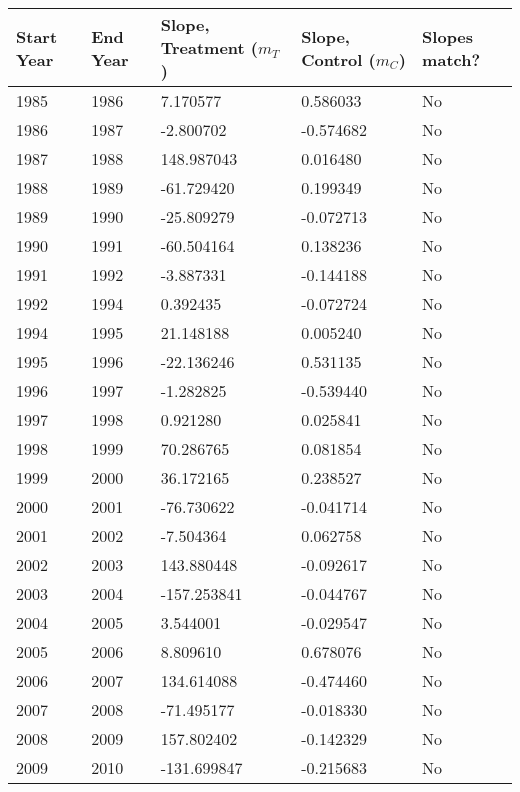 \begin{longtable}{|p{1.2cm}|p{1.2cm}|p{2.2cm}|p{2cm}|p{1.5cm}|}
\centering
\textbf{Start Year} & \textbf{End Year} & \textbf{Slope, Treatment (\({m_T}\)) } & \textbf{Slope, Control (\({m_C}\))} & \textbf{Slopes match?}\\
\hline
1985\rule{0pt}{4ex} & 1986 & 7.170577 & 0.586033 & No\\
1986\rule{0pt}{4ex} & 1987 & -2.800702 & -0.574682 & No\\
1987\rule{0pt}{4ex} & 1988 & 148.987043 & 0.016480 & No\\
1988\rule{0pt}{4ex} & 1989 & -61.729420 & 0.199349 & No\\
1989\rule{0pt}{4ex} & 1990 & -25.809279 & -0.072713 & No\\
1990\rule{0pt}{4ex} & 1991 & -60.504164 & 0.138236 & No\\
1991\rule{0pt}{4ex} & 1992 & -3.887331 & -0.144188 & No\\
1992\rule{0pt}{4ex} & 1994 & 0.392435 & -0.072724 & No\\
1994\rule{0pt}{4ex} & 1995 & 21.148188 & 0.005240 & No\\
1995\rule{0pt}{4ex} & 1996 & -22.136246 & 0.531135 & No\\
1996\rule{0pt}{4ex} & 1997 & -1.282825 & -0.539440 & No\\
1997\rule{0pt}{4ex} & 1998 & 0.921280 & 0.025841 & No\\
1998\rule{0pt}{4ex} & 1999 & 70.286765 & 0.081854 & No\\
1999\rule{0pt}{4ex} & 2000 & 36.172165 & 0.238527 & No\\
2000\rule{0pt}{4ex} & 2001 & -76.730622 & -0.041714 & No\\
2001\rule{0pt}{4ex} & 2002 & -7.504364 & 0.062758 & No\\
2002\rule{0pt}{4ex} & 2003 & 143.880448 & -0.092617 & No\\
2003\rule{0pt}{4ex} & 2004 & -157.253841 & -0.044767 & No\\
2004\rule{0pt}{4ex} & 2005 & 3.544001 & -0.029547 & No\\
2005\rule{0pt}{4ex} & 2006 & 8.809610 & 0.678076 & No\\
2006\rule{0pt}{4ex} & 2007 & 134.614088 & -0.474460 & No\\
2007\rule{0pt}{4ex} & 2008 & -71.495177 & -0.018330 & No\\
2008\rule{0pt}{4ex} & 2009 & 157.802402 & -0.142329 & No\\
2009\rule{0pt}{4ex} & 2010 & -131.699847 & -0.215683 & No\\

\end{longtable}
